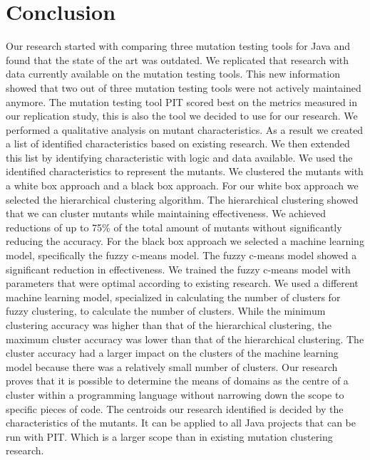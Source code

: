 \documentclass[conference,draftclsnofoot,onecolumn]{IEEEtran}
\begin{document}
\section{Conclusion}
\label{ch:conclusion}
Our research started with comparing three mutation testing tools for Java and found that the state of the art was outdated.
We replicated that research with data currently available on the mutation testing tools.
This new information showed that two out of three mutation testing tools were not actively maintained anymore.
The mutation testing tool PIT scored best on the metrics measured in our replication study, this is also the tool we decided to use for our research.
\newline
We performed a qualitative analysis on mutant characteristics.
As a result we created a list of identified characteristics based on existing research. 
We then extended this list by identifying characteristic with logic and data available.
We used the identified characteristics to represent the mutants.
\newline
We clustered the mutants with a white box approach and a black box approach.
For our white box approach we selected the hierarchical clustering algorithm.
The hierarchical clustering showed that we can cluster mutants while maintaining effectiveness.
We achieved reductions of up to 75\% of the total amount of mutants without significantly reducing the accuracy.
\newline
For the black box approach we selected a machine learning model, specifically the fuzzy c-means model.
The fuzzy c-means model showed a significant reduction in effectiveness.
We trained the fuzzy c-means model with parameters that were optimal according to existing research. 
We used a different machine learning model, specialized in calculating the number of clusters for fuzzy clustering, to calculate the number of clusters.
While the minimum clustering accuracy was higher than that of the hierarchical clustering, the maximum cluster accuracy was lower than that of the hierarchical clustering.
The cluster accuracy had a larger impact on the clusters of the machine learning model because there was a relatively small number of clusters.
Our research proves that it is possible to determine the means of domains as the centre of a cluster within a programming language without narrowing down the scope to specific pieces of code.
The centroids our research identified is decided by the characteristics of the mutants.
It can be applied to all Java projects that can be run with PIT. 
Which is a larger scope than in existing mutation clustering research.

\printbibliography[heading=bibintoc]
\end{document}
